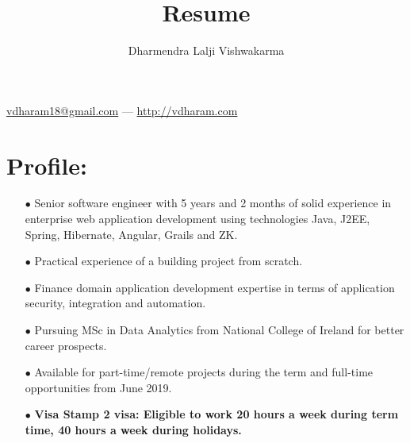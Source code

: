 \documentclass{article}
\makeatletter
\renewcommand{\maketitle}{
\begin{center}
{\LARGE\bfseries
\theauthor}

\vspace{0.25em}
\href{mailto:vdharam18@gmail.com}{vdharam18@gmail.com} --- \href{http://vdharam.com}{http://vdharam.com}
\end{center}	
}
\makeatother
\begin{document}
\title{Resume}
\author{Dharmendra Lalji Vishwakarma}
\maketitle

\section{Profile:}
\begin{itemize}
\itemsep0em
\item[$\bullet$]
Senior software engineer with 5 years and 2 months of solid experience in enterprise web application development using technologies Java, J2EE, Spring, Hibernate, Angular, Grails and ZK.
\item[$\bullet$]
Practical experience of a building project from scratch.
\item[$\bullet$]
Finance domain application development expertise in terms of application security, integration and automation.
\item[$\bullet$]
Pursuing MSc in Data Analytics from National College of Ireland for better career prospects.
\item[$\bullet$]
Available for part-time/remote projects during the term and full-time opportunities from June 2019.
\item[$\bullet$]
\bfseries Visa\linebreak
Stamp 2 visa: Eligible to work 20 hours a week during term time, 40 hours a week during holidays.
\end{itemize}
\end{document}
